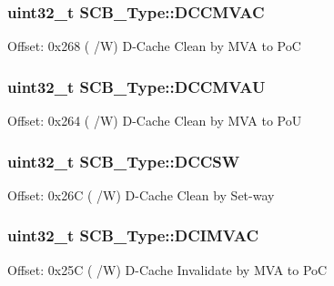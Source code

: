 \subsubsection[{\texorpdfstring{D\+C\+C\+M\+V\+AC}{DCCMVAC}}]{ uint32\+\_\+t S\+C\+B\+\_\+\+Type\+::\+D\+C\+C\+M\+V\+AC}\hypertarget{struct_s_c_b___type_a6887612a34a60a320a299dfe3d50cbf7}{}\label{struct_s_c_b___type_a6887612a34a60a320a299dfe3d50cbf7}
Offset\+: 0x268 ( /W) D-\/\+Cache Clean by M\+VA to PoC 
\subsubsection[{\texorpdfstring{D\+C\+C\+M\+V\+AU}{DCCMVAU}}]{ uint32\+\_\+t S\+C\+B\+\_\+\+Type\+::\+D\+C\+C\+M\+V\+AU}\hypertarget{struct_s_c_b___type_a37356bd9475a8be5a1e9f1489297e5dd}{}\label{struct_s_c_b___type_a37356bd9475a8be5a1e9f1489297e5dd}
Offset\+: 0x264 ( /W) D-\/\+Cache Clean by M\+VA to PoU 
\subsubsection[{\texorpdfstring{D\+C\+C\+SW}{DCCSW}}]{ uint32\+\_\+t S\+C\+B\+\_\+\+Type\+::\+D\+C\+C\+SW}\hypertarget{struct_s_c_b___type_a49dfb8c504b1aced86af1c5eff699755}{}\label{struct_s_c_b___type_a49dfb8c504b1aced86af1c5eff699755}
Offset\+: 0x26C ( /W) D-\/\+Cache Clean by Set-\/way 
\subsubsection[{\texorpdfstring{D\+C\+I\+M\+V\+AC}{DCIMVAC}}]{ uint32\+\_\+t S\+C\+B\+\_\+\+Type\+::\+D\+C\+I\+M\+V\+AC}\hypertarget{struct_s_c_b___type_a2498dd236ec61bc0983f851ec2d1dadc}{}\label{struct_s_c_b___type_a2498dd236ec61bc0983f851ec2d1dadc}
Offset\+: 0x25C ( /W) D-\/\+Cache Invalidate by M\+VA to PoC 
